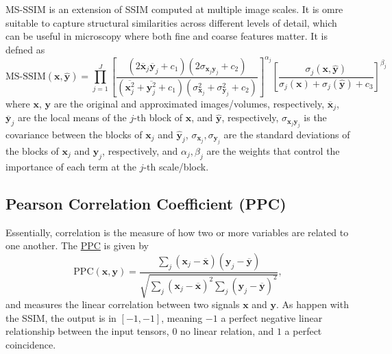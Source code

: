 \documentclass{article}
\begin{document}
MS-SSIM \cite{wang2003multiscale} is an extension of SSIM computed at
multiple image scales. It is omre suitable to capture structural
similarities across different levels of detail, which can be useful in
microscopy where both fine and coarse features matter. It is defned as
\begin{equation}
  \text{MS-SSIM}(\mathbf{x}, \hat{\mathbf{y}}) = \prod_{j=1}^{J} \left[ \frac{(2 \overline{\mathbf{x}}_j \overline{\mathbf{y}}_j + c_1)(2\sigma_{\mathbf{x}_j \mathbf{y}_j} + c_2)}{(\overline{\mathbf{x}_j^2} + \overline{\mathbf{y}_j^2} + c_1)(\sigma^2_{\mathbf{x}_j} + \sigma^2_{\mathbf{y}_j} + c_2)} \right]^{\alpha_j} \left[ \frac{\sigma_j(\mathbf{x}, \hat{\mathbf{y}})}{\sigma_j(\mathbf{x}) + \sigma_j(\hat{\mathbf{y}}) + c_3} \right]^{\beta_j}
\end{equation}
where $\mathbf{x}$, $\mathbf{y}$ are the original and approximated
images/volumes, respectively, $\overline{\mathbf{x}}_j$,
$\overline{\mathbf{y}}_j$ are the local means of the $j\text{-th}$
block of $\mathbf{x}$, and $\hat{\mathbf{y}}$, respectively,
$\sigma_{\mathbf{x}_j \mathbf{y}_j}$ is the covariance between the
blocks of $\mathbf{x}_j$ and $\hat{\mathbf{y}}_j$,
$\sigma_{\mathbf{x}_j}, \sigma_{\mathbf{y}_j}$ are the standard
deviations of the blocks of $\mathbf{x}_j$ and $\mathbf{y}_j$,
respectively, and $\alpha_j, \beta_j$ are the weights that control the
importance of each term at the $j\text{-th}$ scale/block.


\subsection{Pearson Correlation Coefficient (PPC)}
Essentially, correlation is the measure of how two or more variables
are related to one another. The
\href{https://en.wikipedia.org/wiki/Pearson_correlation_coefficient}{PPC}
is given by
\begin{equation}
  \text{PPC}(\mathbf{x}, \mathbf{y}) = \frac{\sum_j(\mathbf{x}_j - \overline{\mathbf{x}})(\mathbf{y}_j - \overline{\mathbf{y}})}{\sqrt{\sum_j (\mathbf{x}_j - \overline{\mathbf{x}})^2 \sum_j (\mathbf{y}_j - \overline{\mathbf{y}})^2}},
\end{equation}
and measures the linear correlation between two signals $\mathbf{x}$
and $\mathbf{y}$.  As happen with the SSIM, the output is in
$[-1, -1]$, meaning $-1$ a perfect negative linear relationship
between the input tensors, $0$ no linear relation, and $1$ a perfect
coincidence.
\end{document}

